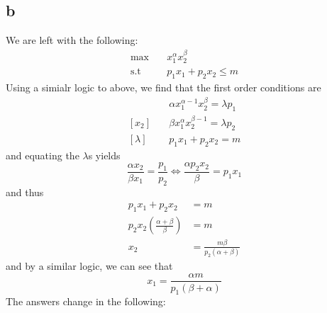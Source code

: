 \documentclass[12pt]{article}
\newcommand{\st}{\text{s.t}}
\begin{document}
\subsection*{b}
We are left with the following:
\begin{align*}
    \max & \quad x_1^\alpha x_2^\beta\\
    \st & \quad p_1 x_1 + p_2 x_2 \leq m 
\end{align*}
Using a simialr logic to above, we find that the first order conditions are
\begin{align*}
    [x_1] & \quad \alpha x^{\alpha - 1}_1 x_2^\beta = \lambda p_1\\
    [x_2] & \quad \beta x^\alpha_1 x_2^{\beta -1} = \lambda p_2\\
    [\lambda] & \quad p_1 x_1 + p_2 x_2 = m
\end{align*}
and equating the $\lambda$s yields 
\[
\frac{\alpha x_2}{\beta x_1} = \frac{p_1}{p_2} \iff \frac{\alpha p_2 x_2}{\beta} = p_1 x_1
\] 
and thus 
\begin{align*}
    p_1 x_1 + p_2 x_2 &= m \\
    p_2x_2\left( \frac{\alpha +\beta}{\beta}\right) &= m\\
    x_2 &= \frac{m \beta}{p_2(\alpha + \beta)}
\end{align*}
and by a similar logic, we can see that 
\[
x_1 = \frac{\alpha m}{p_1(\beta + \alpha)}
\]
The answers change in the following:
\end{document}
